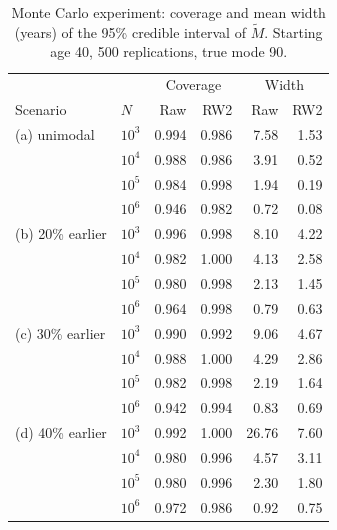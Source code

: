 \begin{table}[htb!]
\centering
\caption{Monte Carlo experiment: coverage and mean width (years) of the 95\% credible interval of $\tilde{M}$. Starting age 40, 500 replications, true mode 90.}
\label{tab:app_coverage}
\small
\begin{tabular}{llrrrr}
\hline
 & & \multicolumn{2}{c}{Coverage} & \multicolumn{2}{c}{Width} \\
Scenario & $N$ & Raw & RW2 & Raw & RW2 \\
\hline
(a) unimodal & $10^3$ & 0.994 & 0.986 & 7.58 & 1.53 \\
 & $10^4$ & 0.988 & 0.986 & 3.91 & 0.52 \\
 & $10^5$ & 0.984 & 0.998 & 1.94 & 0.19 \\
 & $10^6$ & 0.946 & 0.982 & 0.72 & 0.08 \\[2pt]
(b) 20\% earlier & $10^3$ & 0.996 & 0.998 & 8.10 & 4.22 \\
 & $10^4$ & 0.982 & 1.000 & 4.13 & 2.58 \\
 & $10^5$ & 0.980 & 0.998 & 2.13 & 1.45 \\
 & $10^6$ & 0.964 & 0.998 & 0.79 & 0.63 \\[2pt]
(c) 30\% earlier & $10^3$ & 0.990 & 0.992 & 9.06 & 4.67 \\
 & $10^4$ & 0.988 & 1.000 & 4.29 & 2.86 \\
 & $10^5$ & 0.982 & 0.998 & 2.19 & 1.64 \\
 & $10^6$ & 0.942 & 0.994 & 0.83 & 0.69 \\[2pt]
(d) 40\% earlier & $10^3$ & 0.992 & 1.000 & 26.76 & 7.60 \\
 & $10^4$ & 0.980 & 0.996 & 4.57 & 3.11 \\
 & $10^5$ & 0.980 & 0.996 & 2.30 & 1.80 \\
 & $10^6$ & 0.972 & 0.986 & 0.92 & 0.75 \\
\hline
\end{tabular}
\end{table}
